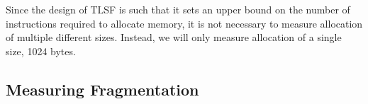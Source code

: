 Since the design of TLSF is such that it sets an upper bound on the number of instructions required to allocate memory, it is not necessary to measure allocation of multiple different sizes. Instead, we will only measure allocation of a single size, 1024 bytes.



%



\subsection{Measuring Fragmentation}


